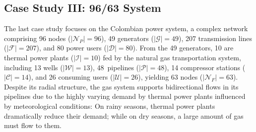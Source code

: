 \subsection{Case Study III: 96/63 System}

The last case study focuses on the Colombian power system, a complex network comprising 96 nodes ($\left | \mathcal{N}_P \right | = 96 $), 49 generators ($\left | \mathcal{G} \right | = 49 $), 207 transmission lines ($\left | \mathcal{F} \right | = 207 $), and 80 power users ($\left | \mathcal{D} \right | = 80 $). From the 49 generators, 10 are thermal power plants ($\left | \mathcal{I} \right | = 10 $) fed by the natural gas transportation system, including 13 wells ($\left | \mathcal{W} \right | = 13 $), \mbox{48 pipelines} ($\left | \mathcal{P} \right | = 48 $), 14 compressor stations ($\left | \mathcal{C} \right | = 14 $), and 26 consuming users (\mbox{$\left | \mathcal{U} \right | = 26 $}), yielding 63 nodes ($\left | \mathcal{N}_{F} \right | = 63 $). Despite its radial structure, the gas system supports bidirectional flows in its pipelines due to the highly varying demand by thermal power plants influenced by meteorological conditions: On rainy seasons, thermal power plants dramatically reduce their demand; while on dry seasons, a large amount of gas must flow to them. 


